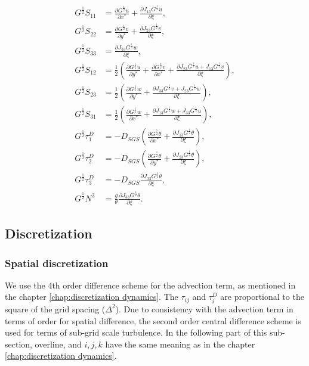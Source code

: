 \begin{align}
  G^{\frac{1}{2}}S_{11} &= \frac{\partial G^{\frac{1}{2}}u}{\partial x^*} + \frac{\partial J_{13}G^{\frac{1}{2}}u}{\partial \xi}, \\
  G^{\frac{1}{2}}S_{22} &= \frac{\partial G^{\frac{1}{2}}v}{\partial y^*} + \frac{\partial J_{23}G^{\frac{1}{2}}v}{\partial \xi}, \\
  G^{\frac{1}{2}}S_{33} &= \frac{\partial J_{33}G^{\frac{1}{2}}w}{\partial \xi}, \\
  G^{\frac{1}{2}}S_{12} &= \frac{1}{2}\left(\frac{\partial G^{\frac{1}{2}}u}{\partial y^*} + \frac{\partial G^{\frac{1}{2}}v}{\partial x^*} + \frac{\partial J_{23}G^{\frac{1}{2}}u + J_{13}G^{\frac{1}{2}}v}{\partial \xi}\right), \\
  G^{\frac{1}{2}}S_{23} &= \frac{1}{2}\left(\frac{\partial G^{\frac{1}{2}}w}{\partial y^*} + \frac{\partial J_{33}G^{\frac{1}{2}}v + J_{23}G^{\frac{1}{2}}w}{\partial \xi}\right), \\
  G^{\frac{1}{2}}S_{31} &= \frac{1}{2}\left(\frac{\partial G^{\frac{1}{2}}w}{\partial x^*} + \frac{\partial J_{13}G^{\frac{1}{2}}w + J_{33}G^{\frac{1}{2}}u}{\partial \xi}\right), \\
  G^{\frac{1}{2}}\tau^D_1 &= -D_{SGS}\left(
   \frac{\partial G^{\frac{1}{2}}\theta}{\partial x^*}
  +\frac{\partial J_{13}G^{\frac{1}{2}}\theta}{\partial \xi} \right), \\
  G^{\frac{1}{2}}\tau^D_2 &= -D_{SGS}\left(
   \frac{\partial G^{\frac{1}{2}}\theta}{\partial y^*}
  +\frac{\partial J_{23}G^{\frac{1}{2}}\theta}{\partial \xi} \right), \\
  G^{\frac{1}{2}}\tau^D_3 &= -D_{SGS}
  \frac{\partial J_{33}G^{\frac{1}{2}}\theta}{\partial \xi}, \\
  G^{\frac{1}{2}} N^2 &= \frac{g}{\theta}\frac{\partial J_{33}G^{\frac{1}{2}}\theta}{\partial \xi}.
\end{align}



\subsection{Discretization}

\subsubsection{Spatial discretization}
We use the 4th order difference scheme for the advection term, as mentioned
in the chapter \ref{chap:discretization dynamics}.
The $\tau_{ij}$ and $\tau^D_{i}$ are proportional to
the square of the grid spacing ($\Delta^2$).
Due to consistency with the advection term
in terms of order for spatial difference,
the second order central difference scheme
is used for terms of sub-grid scale turbulence.
In the following part of this sub-section,
overline, and $i,j,k$ have the same meaning 
as in the chapter \ref{chap:discretization dynamics}.

